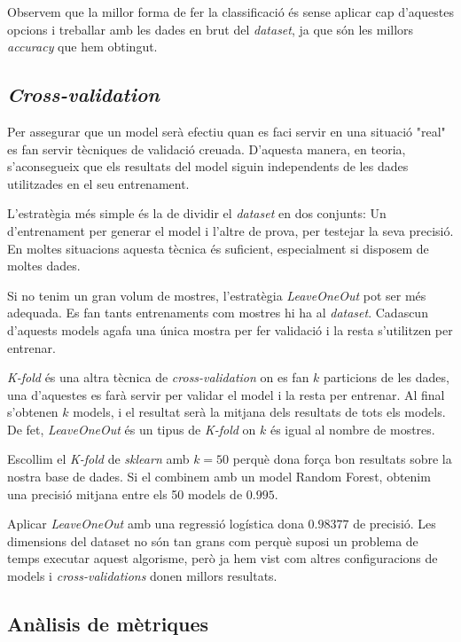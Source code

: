 \documentclass[a4paper, 11pt]{article}
\begin{document}
        Observem que la millor forma de fer la classificació és sense aplicar cap d'aquestes opcions i treballar amb les dades en brut del \textit{dataset}, ja que són les millors \textit{accuracy} que hem obtingut.

        \subsection{\textit{Cross-validation}}
        Per assegurar que un model serà efectiu quan es faci servir en una situació "real" es fan servir tècniques de validació creuada. D'aquesta manera, en teoria, s'aconsegueix que els resultats del model siguin independents de les dades utilitzades en el seu entrenament.

        L'estratègia més simple és la de dividir el \textit{dataset} en dos conjunts: Un d'entrenament per generar el model i l'altre de prova, per testejar la seva precisió. En moltes situacions aquesta tècnica és suficient, especialment si disposem de moltes dades.

        Si no tenim un gran volum de mostres, l'estratègia \textit{LeaveOneOut} pot ser més adequada. Es fan tants entrenaments com mostres hi ha al \textit{dataset}. Cadascun d'aquests models agafa una única mostra per fer validació i la resta s'utilitzen per entrenar.

        \textit{K-fold} és una altra tècnica de \textit{cross-validation} on es fan $k$ particions de les dades, una d'aquestes es farà servir per validar el model i la resta per entrenar. Al final s'obtenen $k$ models, i el resultat serà la mitjana dels resultats de tots els models. De fet, \textit{LeaveOneOut} és un tipus de \textit{K-fold} on $k$ és igual al nombre de mostres.

        Escollim el \textit{K-fold} de \textit{sklearn} amb $k=50$ perquè dona força bon resultats sobre la nostra base de dades. Si el combinem amb un model Random Forest, obtenim una precisió mitjana entre els 50 models de $0.995$.

        Aplicar \textit{LeaveOneOut} amb una regressió logística dona $0.98377$ de precisió. Les dimensions del dataset no són tan grans com perquè suposi un problema de temps executar aquest algorisme, però ja hem vist com altres configuracions de models i \textit{cross-validations} donen millors resultats.

        \subsection{Anàlisis de mètriques}
\end{document}
